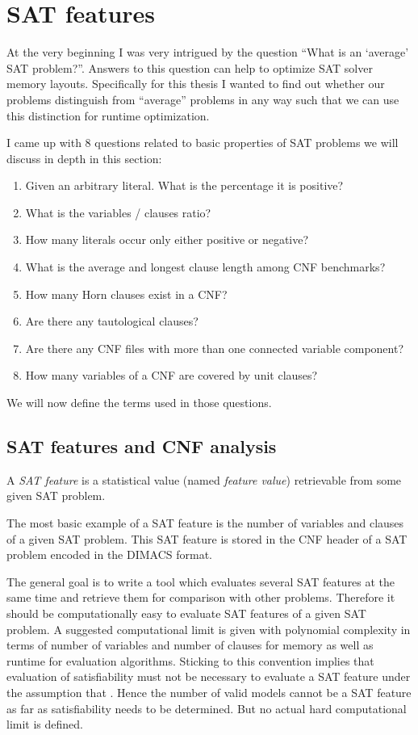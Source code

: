 \chapter{SAT features}
\label{ch:features}
%
At the very beginning I was very intrigued by the question
\enquote{What is an \enquote{average} SAT problem?}. Answers to this
question can help to optimize SAT solver memory layouts.
Specifically for this thesis I wanted to find out whether
our problems distinguish from \enquote{average} problems in any
way such that we can use this distinction for runtime optimization.

I came up with 8 questions related to basic properties of SAT problems
we will discuss in depth in this section:
\begin{enumerate}
\item Given an arbitrary literal. What is the percentage it is positive?
\item What is the variables / clauses ratio?
\item How many literals occur only either positive or negative?
\item What is the average and longest clause length among CNF benchmarks?
\item How many Horn clauses exist in a CNF?
\item Are there any tautological clauses?
\item Are there any CNF files with more than one connected variable component?
\item How many variables of a CNF are covered by unit clauses?
\end{enumerate}

We will now define the terms used in those questions.

\section{SAT features and CNF analysis}
\label{sec:features-analysis}
%
\begin{defi}
  A \emph{SAT feature} is a statistical value (named \emph{feature value})
  retrievable from some given SAT problem.
\end{defi}

The most basic example of a SAT feature is the number of variables and clauses
of a given SAT problem. This SAT feature is stored in the CNF header of a SAT
problem encoded in the DIMACS format.

The general goal is to write a tool which evaluates several SAT features at the same
time and retrieve them for comparison with other problems. Therefore it should be
computationally easy to evaluate SAT features of a given SAT problem. A suggested
computational limit is given with polynomial complexity in terms of number of
variables and number of clauses for memory as well as runtime for evaluation algorithms.
Sticking to this convention implies that evaluation of satisfiability must not be
necessary to evaluate a SAT feature under the assumption that \cPneqNP. Hence the
number of valid models cannot be a SAT feature as far as satisfiability needs to
be determined. But no actual hard computational limit is defined.

